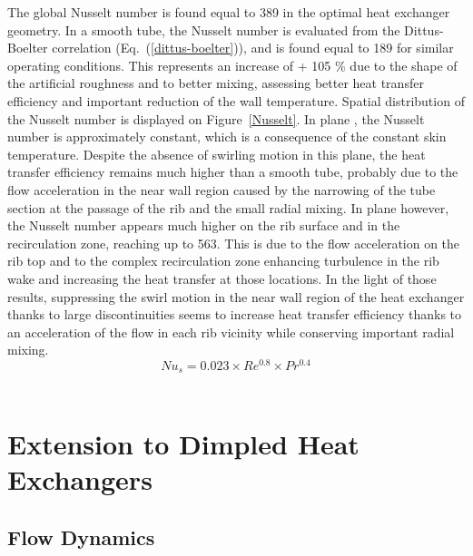 The global Nusselt number is found equal to 389 in the optimal heat exchanger geometry. In a smooth tube, the Nusselt number is evaluated from the Dittus-Boelter correlation \cite{DittusBoelter1930} (Eq.~(\ref{dittus-boelter})), and is found equal to 189 for similar operating conditions. This represents an increase of + 105 \% due to the shape of the artificial roughness and to better mixing, assessing better heat transfer efficiency and important reduction of the wall temperature. Spatial distribution of the Nusselt number is displayed on Figure~\ref{Nusselt}. In plane , the Nusselt number is approximately constant, which is a consequence of the constant skin temperature. Despite the absence of swirling motion in this plane, the heat transfer efficiency remains much higher than a smooth tube, probably due to the flow acceleration in the near wall region caused by the narrowing of the tube section at the passage of the rib and the small radial mixing. In plane  however, the Nusselt number appears much higher on the rib surface and in the recirculation zone, reaching up to 563. This is due to the flow acceleration on the rib top and to the complex recirculation zone enhancing turbulence in the rib wake and increasing the heat transfer at those locations. In the light of those results, suppressing the swirl motion in the near wall region of the heat exchanger thanks to large discontinuities seems to increase heat transfer efficiency thanks to an acceleration of the flow in each rib vicinity while conserving important radial mixing.\\

\begin{equation}
Nu_s = 0.023 \times Re^{0.8} \times Pr^{0.4}
\label{dittus-boelter}
\end{equation}\\

\section{Extension to Dimpled Heat Exchangers}
\label{sec:optim_discussion}

\subsection{Flow Dynamics}
\label{sec:transition_shape}

